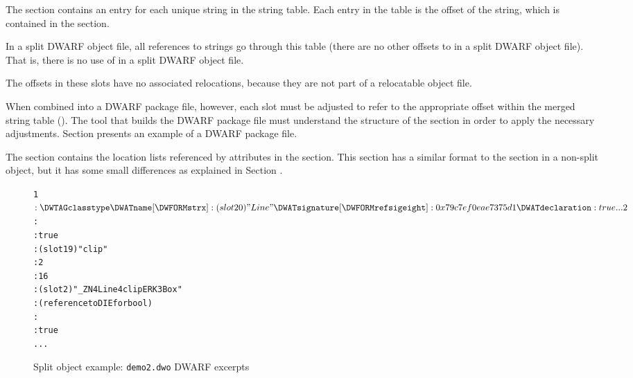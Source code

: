 The \dotdebugstroffsetsdwo{} section contains an entry for each
unique string in the string table. 
Each entry in the table is the offset of the string, which is
contained in the \dotdebugstrdwo{} section. 

In a split DWARF object file, all references to
strings go through this table (there are no
other offsets to \dotdebugstrdwo{} in a split
DWARF object file). That is, there
is no use of \DWFORMstrp{} in a split DWARF object file.

The offsets in these slots have no associated relocations, 
because they are not part of a relocatable object file.

When combined into a DWARF package file, however, each 
slot must be adjusted to refer to the appropriate offset 
within the merged string table (\dotdebugstrdwo{}).
The tool that builds the DWARF package file must understand 
the structure of the \dotdebugstroffsetsdwo{} section in 
order to apply the necessary adjustments. 
Section  presents
an example of a DWARF package file.

The \dotdebuglocdwo{} section contains the location lists referenced
by \DWATlocation{} attributes in the \dotdebuginfodwo{} section. This
section has a similar format to the \dotdebugloc{} section in a
non-split object, but it has some small differences as explained
in Section . 

\begin{figure}[b]
\begin{dwflisting}
\begin{alltt}

1$: \DWTAGclasstype
        \DWATname [\DWFORMstrx]: (slot 20) "Line"
        \DWATsignature [\DWFORMrefsigeight]: 0x79c7ef0eae7375d1
        \DWATdeclaration: true
        ...
2$:     \DWTAGsubprogram
            \DWATexternal: true
            \DWATname [\DWFORMstrx]: (slot 19) "clip"
            \DWATdeclfile: 2
            \DWATdeclline: 16
            \DWATlinkagename [\DWFORMstrx]: (slot 2) "_ZN4Line4clipERK3Box"
            \DWATtype: (reference to DIE for bool)
            \DWATaccessibility: \DWACCESSpublic
            \DWATdeclaration: true
        ...

\end{alltt}
\end{dwflisting}
\caption{Split object example: \texttt{demo2.dwo} DWARF \dotdebuginfodwo{} excerpts}
\label{fig:splitobjectexampledemotwodwodwarfdebuginfodwoexcerpts}
\end{figure}

